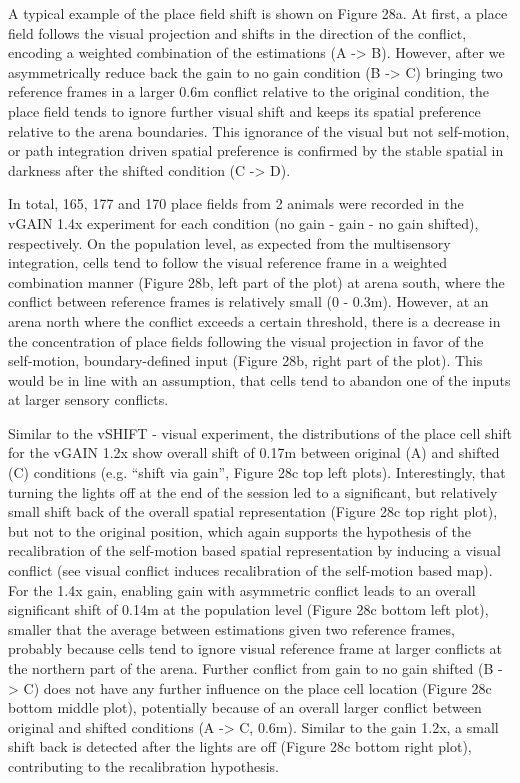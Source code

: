 A typical example of the place field shift is shown on Figure 28a. At first, a place field follows the visual projection and shifts in the direction of the conflict, encoding a weighted combination of the estimations (A -> B). However, after we asymmetrically reduce back the gain to no gain condition (B -> C) bringing two reference frames in a larger 0.6m conflict relative to the original condition, the place field tends to ignore further visual shift and keeps its spatial preference relative to the arena boundaries. This ignorance of the visual but not self-motion, or path integration driven spatial preference is confirmed by the stable spatial in darkness after the shifted condition (C -> D).

In total, 165, 177 and 170 place fields from 2 animals were recorded in the vGAIN 1.4x experiment for each condition (no gain - gain - no gain shifted), respectively. On the population level, as expected from the multisensory integration, cells tend to follow the visual reference frame in a weighted combination manner (Figure 28b, left part of the plot) at arena south, where the conflict between reference frames is relatively small (0 - 0.3m). However, at an arena north where the conflict exceeds a certain threshold, there is a decrease in the concentration of place fields following the visual projection in favor of the self-motion, boundary-defined input (Figure 28b, right part of the plot). This would be in line with an assumption, that cells tend to abandon one of the inputs at larger sensory conflicts.

Similar to the vSHIFT - visual experiment, the distributions of the place cell shift for the vGAIN 1.2x show overall shift of 0.17m between original (A) and shifted (C) conditions (e.g. “shift via gain”, Figure 28c top left plots). Interestingly, that turning the lights off at the end of the session led to a significant, but relatively small shift back of the overall spatial representation (Figure 28c top right plot), but not to the original position, which again supports the hypothesis of the recalibration of the self-motion based spatial representation by inducing a visual conflict (see visual conflict induces recalibration of the self-motion based map). For the 1.4x gain, enabling gain with asymmetric conflict leads to an overall significant shift of 0.14m at the population level (Figure 28c bottom left plot), smaller that the average between estimations given two reference frames, probably because cells tend to ignore visual reference frame at larger conflicts at the northern part of the arena. Further conflict from gain to no gain shifted (B -> C) does not have any further influence on the place cell location (Figure 28c bottom middle plot), potentially because of an overall larger conflict between original and shifted conditions (A -> C, 0.6m). Similar to the gain 1.2x, a small shift back is detected after the lights are off (Figure 28c bottom right plot), contributing to the recalibration hypothesis.
